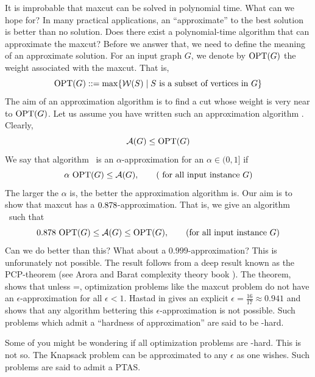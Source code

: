 \documentclass[12pt,
    driverfallback=dvipdfm,
 	openany,
    a4paper,
    toc=bibliography,
    twoside,
    numbers=noenddot]{article}              %
\begin{document}
It is improbable that maxcut can be solved in polynomial time. What can we hope for? In many practical applications, an ``approximate'' to the best solution is better than no solution. Does there exist a polynomial-time algorithm that can approximate the maxcut? Before we answer that, we need to define the meaning of an approximate solution. For an input graph $G$, we denote by $\mathrm{OPT}(G)$ the weight associated with the maxcut. That is, 
\[
\mathrm{OPT}(G) ::= \max \{\mathcal{W}(S) \mid S \text{ is a subset of vertices in } G \}
\]
The aim of an approximation algorithm is to find a cut whose weight is very near to $\mathrm{OPT}(G)$. Let us assume you have written such an approximation algorithm \A. Clearly, 
\[
\mathcal{A}(G) \leq \mathrm{OPT}(G)
\]
We say that algorithm \A\ is an $\alpha$-approximation for an $\alpha \in (0,1]$ if 
\[
\alpha ~\mathrm{OPT}(G) \leq \mathcal{A}(G), \tag{ for all input instance $G$}
\]
The larger the $\alpha$ is, the better the approximation algorithm is. Our aim is to show that maxcut has a $0.878$-approximation. That is, we give an algorithm \A\ such that
\[
0.878 ~\mathrm{OPT}(G) \leq \mathcal{A}(G) \leq \mathrm{OPT}(G), \tag{for all input instance $G$}
\]
Can we do better than this? What about a $0.999$-approximation?  This is unforunately not possible. The result follows from a deep result known as the PCP-theorem (see Arora and Barat complexity theory book \cite{arora}). The theorem, shows that unless \NP=\Ptime, optimization problems like the maxcut problem do not have an $\epsilon$-approximation for all $\epsilon < 1$. Hastad in \cite{hastad} gives an explicit $\epsilon = \frac{16}{17} \approx 0.941$ and shows that any algorithm bettering this $\epsilon$-approximation is not possible. Such problems which admit a ``hardness of approximation'' are said to be \NPX-hard.

Some of you might be wondering if all optimization problems are \NPX-hard. This is not so. The Knapsack problem can be approximated to any $\epsilon$ as one wishes. Such problems are said to admit a PTAS.
\end{document}
